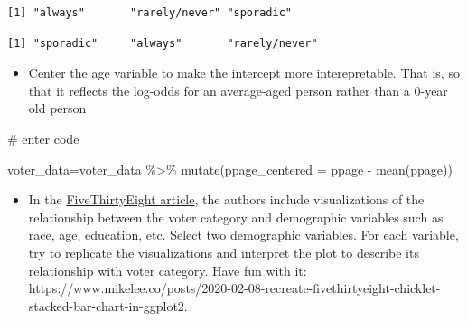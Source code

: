 \documentclass[
  letterpaper,
  DIV=11,
  numbers=noendperiod]{scrartcl}
\newenvironment{Shaded}{\begin{snugshade}}{\end{snugshade}}
\newcommand{\AttributeTok}[1]{\textcolor[rgb]{0.40,0.45,0.13}{#1}}
\newcommand{\CommentTok}[1]{\textcolor[rgb]{0.37,0.37,0.37}{#1}}
\newcommand{\FunctionTok}[1]{\textcolor[rgb]{0.28,0.35,0.67}{#1}}
\newcommand{\NormalTok}[1]{\textcolor[rgb]{0.00,0.23,0.31}{#1}}
\newcommand{\OtherTok}[1]{\textcolor[rgb]{0.00,0.23,0.31}{#1}}
\newcommand{\SpecialCharTok}[1]{\textcolor[rgb]{0.37,0.37,0.37}{#1}}
\newcommand{\StringTok}[1]{\textcolor[rgb]{0.13,0.47,0.30}{#1}}
\providecommand{\tightlist}{%
  \setlength{\itemsep}{0pt}\setlength{\parskip}{0pt}}\usepackage{longtable,booktabs,array}
\begin{document}
\begin{verbatim}
[1] "always"       "rarely/never" "sporadic"    
\end{verbatim}

\begin{Shaded}
\end{Shaded}

\begin{verbatim}
[1] "sporadic"     "always"       "rarely/never"
\end{verbatim}

\begin{itemize}
\tightlist
\item
  Center the age variable to make the intercept more interepretable.
  That is, so that it reflects the log-odds for an average-aged person
  rather than a 0-year old person
\end{itemize}

\begin{Shaded}
\begin{Highlighting}[]
\CommentTok{\# enter code }

\NormalTok{voter\_data}\OtherTok{=}\NormalTok{voter\_data }\SpecialCharTok{\%\textgreater{}\%}
  \FunctionTok{mutate}\NormalTok{(}\AttributeTok{ppage\_centered =}\NormalTok{ ppage }\SpecialCharTok{{-}} \FunctionTok{mean}\NormalTok{(ppage))}
\end{Highlighting}
\end{Shaded}

\begin{itemize}
\tightlist
\item
  In the
  \href{https://projects.fivethirtyeight.com/non-voters-poll-2020-election/}{FiveThirtyEight
  article}, the authors include visualizations of the relationship
  between the voter category and demographic variables such as race,
  age, education, etc. Select two demographic variables. For each
  variable, try to replicate the visualizations and interpret the plot
  to describe its relationship with voter category. Have fun with it:
  https://www.mikelee.co/posts/2020-02-08-recreate-fivethirtyeight-chicklet-stacked-bar-chart-in-ggplot2.
\end{itemize}
\end{document}
